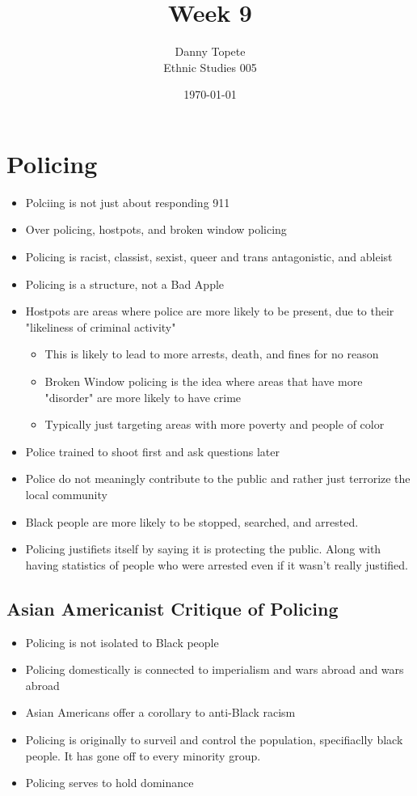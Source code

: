\documentclass{article}
\title{Week 9}
\author{Danny Topete\\ Ethnic Studies 005}
\date{\today}
\begin{document}
\maketitle

\section{Policing}
\begin{itemize}
  \item Polciing is not just about responding 911
  \item Over policing, hostpots, and broken window policing
  \item Policing is racist, classist, sexist, queer and trans antagonistic, and ableist
  \item Policing is a structure, not a Bad Apple
  \item Hostpots are areas where police are more likely to be present, due
    to their "likeliness of criminal activity"
    \begin{itemize}
      \item This is likely to lead to more arrests, death, and fines for no reason
      \item Broken Window policing is the idea where
        areas that have more "disorder" are more likely to have crime
      \item Typically just targeting areas with more poverty and people of color
    \end{itemize}
  \item Police trained to shoot first and ask questions later
  \item Police do not meaningly contribute to the public and rather
    just terrorize the local community
  \item Black people are more likely to be stopped, searched, and arrested.
  \item Policing justifiets itself by saying it is protecting the public.
    Along with having statistics of people who were arrested even
    if it wasn't really justified.
\end{itemize}

\subsection{Asian Americanist Critique of Policing}
\begin{itemize}
  \item Policing is not isolated to Black people
  \item Policing domestically is connected to imperialism and wars abroad
    and wars abroad
  \item Asian Americans offer a corollary to anti-Black racism
  \item Policing is originally to surveil and control the population, specifiaclly
    black people. It has gone off to every minority group.
  \item Policing serves to hold dominance
\end{itemize}
\end{document}
